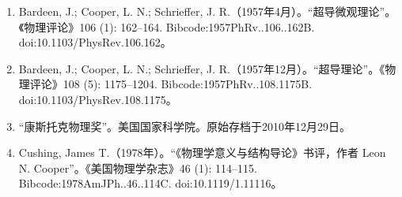 \begin{enumerate}
\item Bardeen, J.; Cooper, L. N.; Schrieffer, J. R.（1957年4月）。“超导微观理论”。《物理评论》106 (1): 162–164. Bibcode:1957PhRv..106..162B. doi:10.1103/PhysRev.106.162。
\item Bardeen, J.; Cooper, L. N.; Schrieffer, J. R.（1957年12月）。“超导理论”。《物理评论》108 (5): 1175–1204. Bibcode:1957PhRv..108.1175B. doi:10.1103/PhysRev.108.1175。
\item “康斯托克物理奖”。美国国家科学院。原始存档于2010年12月29日。
\item Cushing, James T.（1978年）。“《物理学意义与结构导论》书评，作者 Leon N. Cooper”。《美国物理学杂志》46 (1): 114–115. Bibcode:1978AmJPh..46..114C. doi:10.1119/1.11116。
\end{enumerate}

